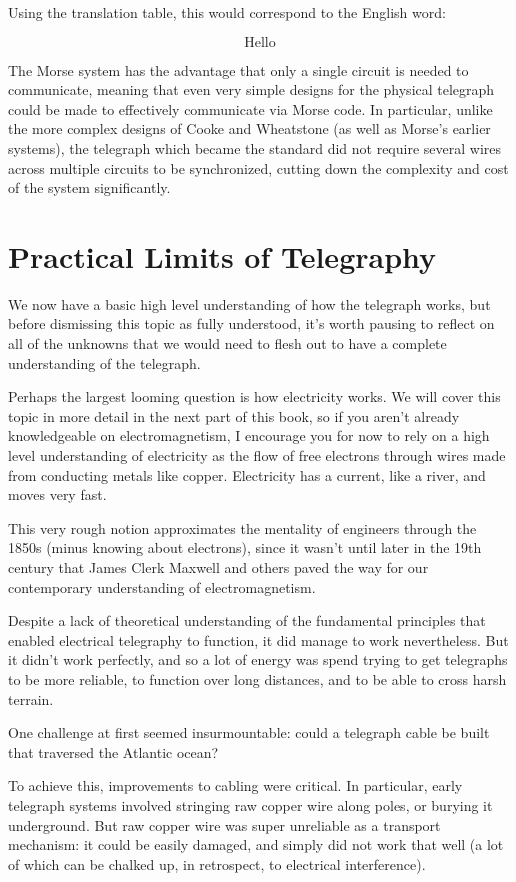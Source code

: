\documentclass[UTF8]{book}
\begin{document}
\begin{CJK}{UTF8}{gbsn}
Using the translation table, this would correspond to the English word:

\[ \text{Hello} \]

The Morse system has the advantage that only a single circuit is needed to communicate, meaning that even very simple designs for the physical telegraph could be made to effectively communicate via Morse code. In particular, unlike the more complex designs of Cooke and Wheatstone (as well as Morse's earlier systems), the telegraph which became the standard did not require several wires across multiple circuits to be synchronized, cutting down the complexity and cost of the system significantly.

\section{Practical Limits of Telegraphy}

We now have a basic high level understanding of how the telegraph works, but before dismissing this topic as fully understood, it's worth pausing to reflect on all of the unknowns that we would need to flesh out to have a complete understanding of the telegraph.

Perhaps the largest looming question is how electricity works. We will cover this topic in more detail in the next part of this book, so if you aren't already knowledgeable on electromagnetism, I encourage you for now to rely on a high level understanding of electricity as the flow of free electrons through wires made from conducting metals like copper. Electricity has a current, like a river, and moves very fast.

This very rough notion approximates the mentality of engineers through the 1850s (minus knowing about electrons), since it wasn't until later in the 19th century that James Clerk Maxwell and others paved the way for our contemporary understanding of electromagnetism.

Despite a lack of theoretical understanding of the fundamental principles that enabled electrical telegraphy to function, it did manage to work nevertheless. But it didn't work perfectly, and so a lot of energy was spend trying to get telegraphs to be more reliable, to function over long distances, and to be able to cross harsh terrain.

One challenge at first seemed insurmountable: could a telegraph cable be built that traversed the Atlantic ocean?

To achieve this, improvements to cabling were critical. In particular, early telegraph systems involved stringing raw copper wire along poles, or burying it underground. But raw copper wire was super unreliable as a transport mechanism: it could be easily damaged, and simply did not work that well (a lot of which can be chalked up, in retrospect, to electrical interference).


\end{CJK}
\end{document}
